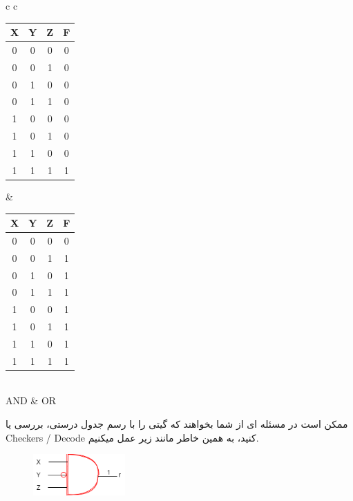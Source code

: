 \documentclass[20pt, a5paper]{article}
\begin{document}
\center 
\begin{LTR}
	\begin{tabular}{ c c }
			\begin{tabular}{ c c c | c }
		X & Y & Z & F \\
		\hline
		0 & 0 & 0 &  0\\ 				
		0 & 0 & 1 &  0\\
		0 & 1 & 0 &  0\\
		0 & 1 & 1 &  0\\
		1 & 0 & 0 &  0\\
		1 & 0 & 1 &  0\\
		1 & 1 & 0 &  0\\
		1 & 1 & 1 &  1\\	
	\end{tabular}
	
	&
		\begin{tabular}{ c c c | c }
		X & Y & Z & F \\
		\hline
		0 & 0 & 0 &  0\\ 				
		0 & 0 & 1 &  1\\
		0 & 1 & 0 &  1\\
		0 & 1 & 1 &  1\\
		1 & 0 & 0 &  1\\
		1 & 0 & 1 &  1\\
		1 & 1 & 0 &  1\\
		1 & 1 & 1 &  1\\	
	\end{tabular}\\
	\hline
	AND & OR
	\end{tabular}
\end{LTR}
\hfill \break

\raggedleft
\justifying
ممکن است در مسئله ای از شما بخواهند که گیتی را با رسم جدول درستی، بررسی یا Checkers / Decode کنید، به همین خاطر مانند زیر عمل میکنیم.\\

\begin{figure}[htbp]
	\centerline{\includegraphics[width=100pt]{img/andGate.png}}
\end{figure}
\end{document}
